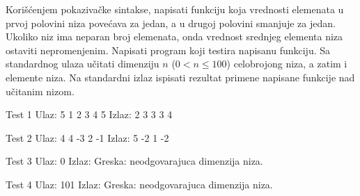 \begin{Exercise}[label=303]
Korišćenjem pokazivačke sintakse, napisati funkciju koja
vrednosti elemenata u prvoj polovini niza povećava za jedan, a u
drugoj polovini smanjuje za jedan. Ukoliko niz ima neparan broj
elemenata, onda vrednost srednjeg elementa niza ostaviti
nepromenjenim. Napisati program koji testira napisanu funkciju. Sa
standardnog ulaza učitati dimenziju $n$ ($0 < n \leq 100$)
celobrojong niza, a zatim i elemente niza. Na standardni izlaz
ispisati rezultat primene napisane funkcije nad učitanim nizom.

\begin{miditest}
\begin{test}{Test 1}
Ulaz: 5 
      1 2 3 4 5
Izlaz: 2 3 3 3 4
\end{test}
\end{miditest} 
\begin{miditest}
\begin{test}{Test 2}
Ulaz: 4 
      4 -3 2 -1
Izlaz: 5 -2 1 -2
\end{test}
\end{miditest} 

\begin{maxitest}
\begin{test}{Test 3}
Ulaz: 0
Izlaz: Greska: neodgovarajuca dimenzija niza.
\end{test}
\end{maxitest}

\begin{maxitest}
\begin{test}{Test 4}
Ulaz: 101
Izlaz: Greska: neodgovarajuca dimenzija niza.
\end{test}
\end{maxitest}
\end{Exercise}
\begin{Answer}[ref=303]
\end{Answer}

